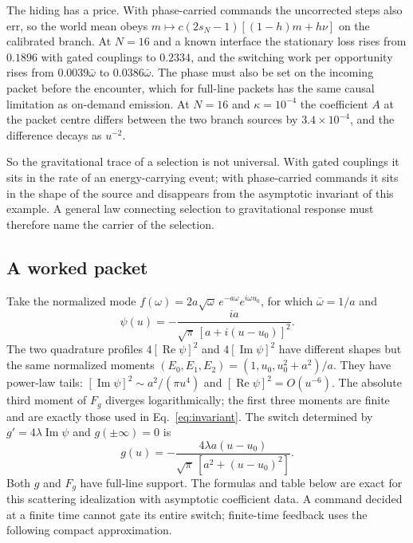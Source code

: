 \documentclass[12pt,a4paper]{article}
\begin{document}
The hiding has a price. With phase-carried commands the uncorrected steps also err, so the world mean obeys $m\mapsto c(2s_N-1)[(1-h)m+h\nu]$ on the calibrated branch. At $N=16$ and a known interface the stationary loss rises from $0.1896$ with gated couplings to $0.2334$, and the switching work per opportunity rises from $0.0039\bar\omega$ to $0.0386\bar\omega$. The phase must also be set on the incoming packet before the encounter, which for full-line packets has the same causal limitation as on-demand emission. At $N=16$ and $\kappa=10^{-4}$ the coefficient $A$ at the packet centre differs between the two branch sources by $3.4\times10^{-4}$, and the difference decays as $u^{-2}$.

So the gravitational trace of a selection is not universal. With gated couplings it sits in the rate of an energy-carrying event; with phase-carried commands it sits in the shape of the source and disappears from the asymptotic invariant of this example. A general law connecting selection to gravitational response must therefore name the carrier of the selection.


\subsection{A worked packet}
\label{sec:packet}

Take the normalized mode $f(\omega)=2a\sqrt\omega\,e^{-a\omega}e^{i\omega u_0}$, for which $\bar\omega=1/a$ and
\begin{equation}
\psi(u)=-\frac{ia}{\sqrt\pi\,[a+i(u-u_0)]^2}.
\end{equation}
The two quadrature profiles $4[\operatorname{Re}\psi]^2$ and $4[\operatorname{Im}\psi]^2$ have different shapes but the same normalized moments $(E_0,E_1,E_2)=(1,u_0,u_0^2+a^2)/a$. They have power-law tails: $[\operatorname{Im}\psi]^2\sim a^2/(\pi u^4)$ and $[\operatorname{Re}\psi]^2=O(u^{-6})$. The absolute third moment of $F_g$ diverges logarithmically; the first three moments are finite and are exactly those used in Eq.~\eqref{eq:invariant}. The switch determined by $g'=4\lambda\operatorname{Im}\psi$ and $g(\pm\infty)=0$ is
\begin{equation}
 g(u)=-\frac{4\lambda a(u-u_0)}{\sqrt\pi\,[a^2+(u-u_0)^2]}.
 \label{eq:exact-switch}
\end{equation}
Both $g$ and $F_g$ have full-line support. The formulas and table below are exact
for this scattering idealization with asymptotic coefficient data. A command decided
at a finite time cannot gate its entire switch; finite-time feedback uses the
following compact approximation.
\end{document}

